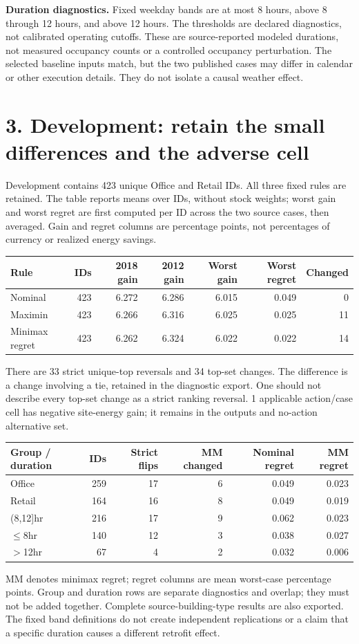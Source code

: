 \documentclass[10pt,letterpaper]{article}
\begin{document}
\textbf{Duration diagnostics.} Fixed weekday bands are at most 8 hours, above 8 through 12 hours, and above 12 hours. The thresholds are declared diagnostics, not calibrated operating cutoffs. These are source-reported modeled durations, not measured occupancy counts or a controlled occupancy perturbation. The selected baseline inputs match, but the two published cases may differ in calendar or other execution details. They do not isolate a causal weather effect.
\newpage
\section*{3. Development: retain the small differences and the adverse cell}
Development contains 423 unique Office and Retail IDs. All three fixed rules are retained. The table reports means over IDs, without stock weights; worst gain and worst regret are first computed per ID across the two source cases, then averaged. Gain and regret columns are percentage points, not percentages of currency or realized energy savings.
\begin{center}\small\begin{tabular}{lrrrrrr}\toprule
Rule & IDs & 2018 gain & 2012 gain & Worst gain & Worst regret & Changed\\\midrule
Nominal & 423 & 6.272 & 6.286 & 6.015 & 0.049 & 0 \\
Maximin & 423 & 6.266 & 6.316 & 6.025 & 0.025 & 11 \\
Minimax regret & 423 & 6.262 & 6.324 & 6.022 & 0.022 & 14 \\
\bottomrule\end{tabular}\end{center}
There are 33 strict unique-top reversals and 34 top-set changes. The difference is a change involving a tie, retained in the diagnostic export. One should not describe every top-set change as a strict ranking reversal. 1 applicable action/case cell has negative site-energy gain; it remains in the outputs and no-action alternative set.

\begin{center}\small\begin{tabular}{lrrrrr}\toprule
Group / duration & IDs & Strict flips & MM changed & Nominal regret & MM regret\\\midrule
Office & 259 & 17 & 6 & 0.049 & 0.023 \\
Retail & 164 & 16 & 8 & 0.049 & 0.019 \\
(8,12]hr & 216 & 17 & 9 & 0.062 & 0.023 \\
$\leq$8hr & 140 & 12 & 3 & 0.038 & 0.027 \\
$>$12hr & 67 & 4 & 2 & 0.032 & 0.006 \\
\bottomrule\end{tabular}\end{center}
MM denotes minimax regret; regret columns are mean worst-case percentage points. Group and duration rows are separate diagnostics and overlap; they must not be added together. Complete source-building-type results are also exported. The fixed band definitions do not create independent replications or a claim that a specific duration causes a different retrofit effect.
\end{document}
